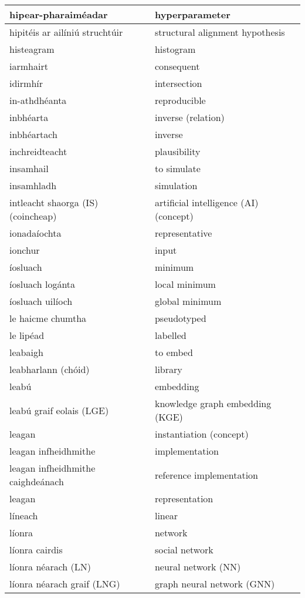 \begin{longtable}{|l|l|}
		hipear-pharaiméadar&hyperparameter\\ \hline 
		hipitéis ar ailíniú struchtúir&structural alignment hypothesis\\ \hline 
		histeagram&histogram\\ \hline 
		iarmhairt&consequent\\ \hline 
		idirmhír&intersection\\ \hline 
		in-athdhéanta&reproducible\\ \hline 
		inbhéarta&inverse (relation)\\ \hline 
		inbhéartach&inverse\\ \hline 
		inchreidteacht&plausibility\\ \hline 
		insamhail&to simulate\\ \hline 
		insamhladh&simulation\\ \hline 
		intleacht shaorga (IS) (coincheap)&artificial intelligence (AI) (concept)\\ \hline 
		ionadaíochta&representative\\ \hline 
		ionchur&input\\ \hline 
		íosluach&minimum\\ \hline 
		íosluach logánta&local minimum\\ \hline 
		íosluach uilíoch&global minimum\\ \hline 
		le haicme chumtha&pseudotyped\\ \hline 
		le lipéad&labelled\\ \hline 
		leabaigh&to embed\\ \hline 
		leabharlann (chóid)&library\\ \hline 
		leabú&embedding\\ \hline 
		leabú graif eolais (LGE)&knowledge graph embedding (KGE)\\ \hline 
		leagan&instantiation (concept)\\ \hline 
		leagan infheidhmithe&implementation\\ \hline 
		leagan infheidhmithe caighdeánach&reference implementation\\ \hline 
		leagan&representation\\ \hline 
		líneach&linear\\ \hline 
		líonra&network\\ \hline 
		líonra cairdis&social network\\ \hline 
		líonra néarach (LN)&neural network (NN)\\ \hline 
		líonra néarach graif (LNG)&graph neural network (GNN)\\ \hline 

\end{longtable}
